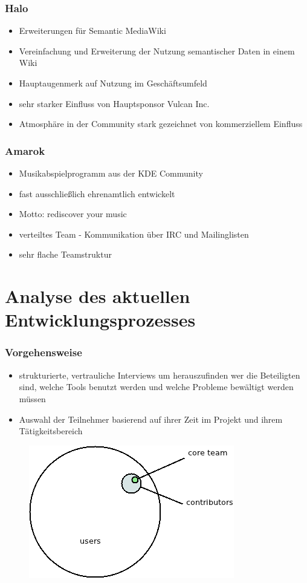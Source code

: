 \documentclass{beamer}
\begin{document}
\begin{frame}
\frametitle{Halo}
\begin{itemize}
 \item Erweiterungen f\"ur Semantic MediaWiki
 \item Vereinfachung und Erweiterung der Nutzung semantischer Daten in einem Wiki
 \item Hauptaugenmerk auf Nutzung im Gesch\"aftsumfeld
 \item sehr starker Einfluss von Hauptsponsor Vulcan Inc.
 \item Atmosph\"are in der Community stark gezeichnet von kommerziellem Einfluss
\end{itemize}
\end{frame}

\begin{frame}
\frametitle{Amarok}
\begin{itemize}
 \item Musikabspielprogramm aus der KDE Community
 \item fast ausschlie\ss lich ehrenamtlich entwickelt
 \item Motto: rediscover your music
 \item verteiltes Team - Kommunikation \"uber IRC und Mailinglisten
 \item sehr flache Teamstruktur
\end{itemize}
\end{frame}

\section{Analyse des aktuellen Entwicklungsprozesses}

\begin{frame}
\frametitle{Vorgehensweise}
\begin{itemize}
 \item strukturierte, vertrauliche Interviews um herauszufinden wer die Beteiligten sind, welche Tools benutzt werden und welche Probleme bew\"altigt werden m\"ussen
 \item Auswahl der Teilnehmer basierend auf ihrer Zeit im Projekt und ihrem T\"atigkeitsbereich
\end{itemize}
\begin{figure}[h!]
 \centering
 \includegraphics[scale=0.35,keepaspectratio=true]{./communitymodel.png}
\end{figure}
\end{frame}
\end{document}
